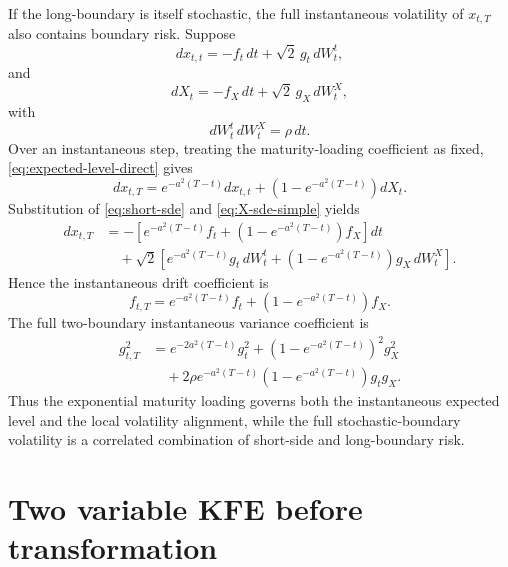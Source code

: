 \documentclass[11pt]{article}
\numberwithin{equation}{section}
\begin{document}
If the long-boundary is itself stochastic, the full instantaneous volatility of \(x_{t,T}\) also contains boundary risk. Suppose
\begin{equation}
\label{eq:short-sde}
dx_{t,t}=-f_t\,dt+\sqrt{2}\,g_t\,dW_t^t,
\end{equation}
and
\begin{equation}
\label{eq:X-sde-simple}
dX_t=-f_X\,dt+\sqrt{2}\,g_X\,dW_t^X,
\end{equation}
with
\begin{equation}
\label{eq:rho-simple}
dW_t^t\,dW_t^X=\rho\,dt.
\end{equation}
Over an instantaneous step, treating the maturity-loading coefficient as fixed, \eqref{eq:expected-level-direct} gives
\[
dx_{t,T}
=
e^{-a^2(T-t)}dx_{t,t}
+
\left(1-e^{-a^2(T-t)}\right)dX_t.
\]
Substitution of \eqref{eq:short-sde} and \eqref{eq:X-sde-simple} yields
\begin{align}
\label{eq:maturity-T-sde}
dx_{t,T}
&=
-\left[
e^{-a^2(T-t)}f_t
+
\left(1-e^{-a^2(T-t)}\right)f_X
\right]dt
\nonumber\\
&\quad+
\sqrt{2}\left[
e^{-a^2(T-t)}g_t\,dW_t^t
+
\left(1-e^{-a^2(T-t)}\right)g_X\,dW_t^X
\right].
\end{align}
Hence the instantaneous drift coefficient is
\begin{equation}
\label{eq:instantaneous-drift-maturity-T}
f_{t,T}
=
e^{-a^2(T-t)}f_t
+
\left(1-e^{-a^2(T-t)}\right)f_X.
\end{equation}
The full two-boundary instantaneous variance coefficient is
\begin{align}
\label{eq:instantaneous-vol-maturity-T}
g_{t,T}^2
&=
e^{-2a^2(T-t)}g_t^2
+
\left(1-e^{-a^2(T-t)}\right)^2g_X^2
\nonumber\\
&\quad+
2\rho e^{-a^2(T-t)}\left(1-e^{-a^2(T-t)}\right)g_tg_X.
\end{align}
Thus the exponential maturity loading governs both the instantaneous expected level and the local volatility alignment, while the full stochastic-boundary volatility is a correlated combination of short-side and long-boundary risk.

\section{Two variable KFE before transformation}
\end{document}
